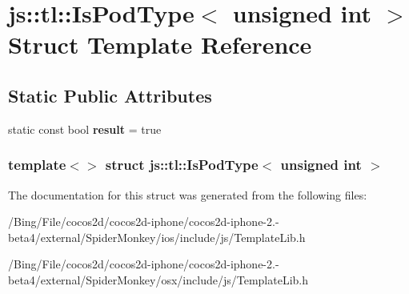 \hypertarget{structjs_1_1tl_1_1_is_pod_type_3_01unsigned_01int_01_4}{\section{js\-:\-:tl\-:\-:Is\-Pod\-Type$<$ unsigned int $>$ Struct Template Reference}
\label{structjs_1_1tl_1_1_is_pod_type_3_01unsigned_01int_01_4}
}
\subsection*{Static Public Attributes}
\begin{DoxyCompactItemize}
\item 
\hypertarget{structjs_1_1tl_1_1_is_pod_type_3_01unsigned_01int_01_4_aee6e6a91c2eb8eb81195cd8e43d1d347}{static const bool {\bfseries result} = true}\label{structjs_1_1tl_1_1_is_pod_type_3_01unsigned_01int_01_4_aee6e6a91c2eb8eb81195cd8e43d1d347}

\end{DoxyCompactItemize}
\subsubsection*{template$<$$>$ struct js\-::tl\-::\-Is\-Pod\-Type$<$ unsigned int $>$}



The documentation for this struct was generated from the following files\-:\begin{DoxyCompactItemize}
\item 
/\-Bing/\-File/cocos2d/cocos2d-\/iphone/cocos2d-\/iphone-\/2.-\/beta4/external/\-Spider\-Monkey/ios/include/js/Template\-Lib.\-h\item 
/\-Bing/\-File/cocos2d/cocos2d-\/iphone/cocos2d-\/iphone-\/2.-\/beta4/external/\-Spider\-Monkey/osx/include/js/Template\-Lib.\-h\end{DoxyCompactItemize}
